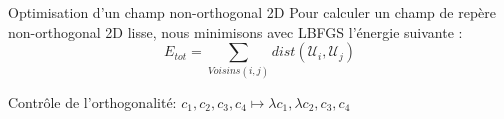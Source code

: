 \begin{frame}{Optimisation d'un champ non-orthogonal 2D}
    \centering
    \small
    Pour calculer un champ de repère non-orthogonal 2D lisse, nous minimisons avec LBFGS l'énergie suivante :
    $$ E_{tot} = \sum_{Voisins(i, j)} dist(\mathcal{U}_i, \mathcal{U}_j)$$
    
    Contrôle de l'orthogonalité: $c_1, c_2, c_3, c_4 \mapsto \lambda c_1, \lambda c_2, c_3, c_4$ 
     
     \vspace*{0.5\baselineskip}
    \begin{minipage}[b]{0.15\textwidth}
        \centering

\end{minipage}
\end{frame}
